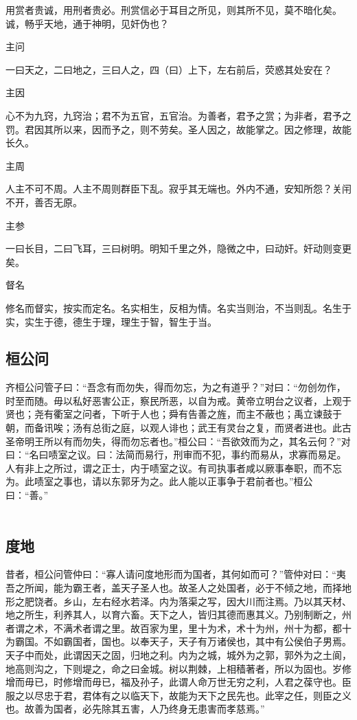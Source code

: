 \documentclass[]{article}
\begin{document}
用赏者贵诚，用刑者贵必。刑赏信必于耳目之所见，则其所不见，莫不暗化矣。诚，畅乎天地，通于神明，见奸伪也？

主问

一曰天之，二曰地之，三曰人之，四（曰）上下，左右前后，荧惑其处安在？

主因

心不为九窍，九窍治；君不为五官，五官治。为善者，君予之赏；为非者，君予之罚。君因其所以来，因而予之，则不劳矣。圣人因之，故能掌之。因之修理，故能长久。

主周

人主不可不周。人主不周则群臣下乱。寂乎其无端也。外内不通，安知所怨？关闬不开，善否无原。

主参

一曰长目，二曰飞耳，三曰树明。明知千里之外，隐微之中，曰动奸。奸动则变更矣。

督名

修名而督实，按实而定名。名实相生，反相为情。名实当则治，不当则乱。名生于实，实生于德，德生于理，理生于智，智生于当。

\hypertarget{header-n732}{%
\subsection{桓公问}\label{header-n732}}

齐桓公问管子曰：``吾念有而勿失，得而勿忘，为之有道乎？''对曰：``勿创勿作，时至而随。毋以私好恶害公正，察民所恶，以自为戒。黄帝立明台之议者，上观于贤也；尧有衢室之问者，下听于人也；舜有告善之旌，而主不蔽也；禹立谏鼓于朝，而备讯唉；汤有总街之庭，以观人诽也；武王有灵台之复，而贤者进也。此古圣帝明王所以有而勿失，得而勿忘者也。''桓公曰：``吾欲效而为之，其名云何？''对曰：``名曰啧室之议。曰：法简而易行，刑审而不犯，事约而易从，求寡而易足。人有非上之所过，谓之正士，内于啧室之议。有司执事者咸以厥事奉职，而不忘为。此啧室之事也，请以东郭牙为之。此人能以正事争于君前者也。''桓公曰：``善。''\\
~\\

\hypertarget{header-n734}{%
\subsection{度地}\label{header-n734}}

昔者，桓公问管仲曰：``寡人请问度地形而为国者，其何如而可？''管仲对曰：``夷吾之所闻，能为霸王者，盖天子圣人也。故圣人之处国者，必于不倾之地，而择地形之肥饶者。乡山，左右经水若泽。内为落渠之写，因大川而注焉。乃以其天材、地之所生，利养其人，以育六畜。天下之人，皆归其德而惠其义。乃别制断之，州者谓之术，不满术者谓之里。故百家为里，里十为术，术十为州，州十为都，都十为霸国。不如霸国者，国也。以奉天子，天子有万诸侯也，其中有公侯伯子男焉。天子中而处，此谓因天之固，归地之利。内为之城，城外为之郭，郭外为之土阆，地高则沟之，下则堤之，命之曰金城。树以荆棘，上相穑著者，所以为固也。岁修增而毋已，时修增而毋已，福及孙子，此谓人命万世无穷之利，人君之葆守也。臣服之以尽忠于君，君体有之以临天下，故能为天下之民先也。此宰之任，则臣之义也。故善为国者，必先除其五害，人乃终身无患害而孝慈焉。''
\end{document}
